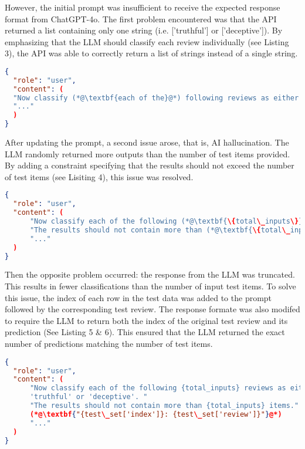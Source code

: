 \documentclass[sigconf, nonacm]{acmart}
\theoremstyle{definition}
\begin{document}
However, the initial prompt was insufficient to receive the expected response format from ChatGPT-4o. The first problem encountered was that the API returned a list containing only one string (i.e. ['truthful'] or ['deceptive']). By emphasizing that the LLM should classify each review individually (see Listing 3), the API was able to correctly return a list of strings instead of a single string.

\begin{lstlisting}[language=json, caption={Updated User Messages 1}]
{
  "role": "user",
  "content": (
  "Now classify (*@\textbf{each of the}@*) following reviews as either 'truthful' or 'deceptive'. "
  "..."
  )
}
\end{lstlisting}

After updating the prompt, a second issue arose, that is, AI hallucination. The LLM randomly returned more outputs than the number of test items provided. By adding a constraint specifying that the results should not exceed the number of test items (see Lisiting 4), this issue was resolved.

\begin{lstlisting}[language=json, caption={Updated User Messages 2}]
{
  "role": "user",
  "content": (
      "Now classify each of the following (*@\textbf{\{total\_inputs\}}@*) reviews as either 'truthful' or 'deceptive'. "
      "The results should not contain more than (*@\textbf{\{total\_inputs\}}@*) items."
      "..."
  )
}
\end{lstlisting}

Then the opposite problem occurred: the response from the LLM was truncated. This results in fewer classifications than the number of input test items. To solve this issue, the index of each row in the test data was added to the prompt followed by the corresponding test review. The response formate was also modifed to require the LLM to return both the index of the original test review and its prediction (See Listing 5 \& 6). This ensured that the LLM returned the exact number of predictions matching the number of test items.

\begin{lstlisting}[language=json, caption={Updated User Messages 3}]
{
  "role": "user",
  "content": (
      "Now classify each of the following {total_inputs} reviews as either 
      'truthful' or 'deceptive'. "
      "The results should not contain more than {total_inputs} items."
      (*@\textbf{"{test\_set['index']}: {test\_set['review']}"}@*)
      "..."
  )
}
\end{lstlisting}
\end{document}
